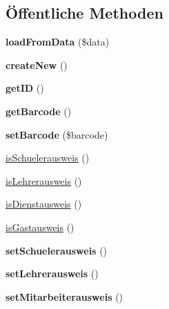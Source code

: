 \subsection*{Öffentliche Methoden}
\begin{DoxyCompactItemize}
\item 
\mbox{\label{class_abstract_ausweis_a6bd953aab92692f79145d2a273c23f44}} 
{\bfseries load\+From\+Data} (\$data)
\item 
\mbox{\label{class_abstract_ausweis_adcc93e31390f79499383e290da31fc5b}} 
{\bfseries create\+New} ()
\item 
\mbox{\label{class_abstract_ausweis_ad435923aa2be8517df3b189a720bf40b}} 
{\bfseries get\+ID} ()
\item 
\mbox{\label{class_abstract_ausweis_a30fb209f3f7495ef741d01d87039dc1b}} 
{\bfseries get\+Barcode} ()
\item 
\mbox{\label{class_abstract_ausweis_a66b868b6d513c13f856d94e50f747fd9}} 
{\bfseries set\+Barcode} (\$barcode)
\item 
\mbox{\hyperlink{class_abstract_ausweis_af3fcb96804b4317592ef070c6b34b75f}{is\+Schuelerausweis}} ()
\item 
\mbox{\hyperlink{class_abstract_ausweis_ac68634e5fea5ede965524abdca0037df}{is\+Lehrerausweis}} ()
\item 
\mbox{\hyperlink{class_abstract_ausweis_a19af2e5691f67fda2fa746a9d8b30a0b}{is\+Dienstausweis}} ()
\item 
\mbox{\hyperlink{class_abstract_ausweis_aad80fe59f398742405e0b1ddb004a014}{is\+Gastausweis}} ()
\item 
\mbox{\label{class_abstract_ausweis_a103957e5234adbb5a28ad60f91a44c0a}} 
{\bfseries set\+Schuelerausweis} ()
\item 
\mbox{\label{class_abstract_ausweis_a9917f1b2bffdd28aa3c4b273c1aec393}} 
{\bfseries set\+Lehrerausweis} ()
\item 
\mbox{\label{class_abstract_ausweis_adae5192bf1cc459109719124d4777752}} 
{\bfseries set\+Mitarbeiterausweis} ()

\end{DoxyCompactItemize}
